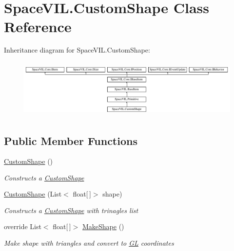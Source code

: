 \hypertarget{class_space_v_i_l_1_1_custom_shape}{}\section{Space\+V\+I\+L.\+Custom\+Shape Class Reference}
\label{class_space_v_i_l_1_1_custom_shape}
Inheritance diagram for Space\+V\+I\+L.\+Custom\+Shape\+:\begin{figure}[H]
\begin{center}
\leavevmode
\includegraphics[height=3.027027cm]{class_space_v_i_l_1_1_custom_shape}
\end{center}
\end{figure}
\subsection*{Public Member Functions}
\begin{DoxyCompactItemize}
\item 
\mbox{\hyperlink{class_space_v_i_l_1_1_custom_shape_ab67f8e1e17f268ca2e24f516f762323e}{Custom\+Shape}} ()
\begin{DoxyCompactList}\small\item\em Constructs a \mbox{\hyperlink{class_space_v_i_l_1_1_custom_shape}{Custom\+Shape}} \end{DoxyCompactList}\item 
\mbox{\hyperlink{class_space_v_i_l_1_1_custom_shape_ad5b5ff7c5f594e7b7fcde384b8cb6d0b}{Custom\+Shape}} (List$<$ float\mbox{[}$\,$\mbox{]}$>$ shape)
\begin{DoxyCompactList}\small\item\em Constructs a \mbox{\hyperlink{class_space_v_i_l_1_1_custom_shape}{Custom\+Shape}} with trinagles list \end{DoxyCompactList}\item 
override List$<$ float\mbox{[}$\,$\mbox{]}$>$ \mbox{\hyperlink{class_space_v_i_l_1_1_custom_shape_aa8a1eb76ab361eea35540787f79fac6f}{Make\+Shape}} ()
\begin{DoxyCompactList}\small\item\em Make shape with triangles and convert to \mbox{\hyperlink{namespace_g_l}{GL}} coordinates \end{DoxyCompactList}\end{DoxyCompactItemize}
